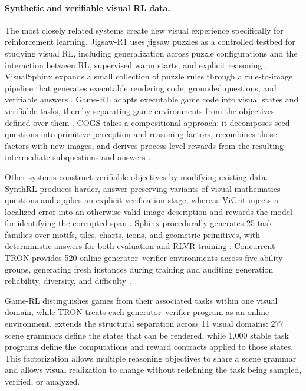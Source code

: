 \paragraph{Synthetic and verifiable visual RL data.}
The most closely related systems create new visual experience specifically for
reinforcement learning. Jigsaw-R1 uses jigsaw puzzles as a controlled testbed for
studying visual RL, including generalization across puzzle configurations and the
interaction between RL, supervised warm starts, and explicit reasoning
\citep{wang2025jigsawr1}. VisualSphinx expands a small collection of puzzle
rules through a rule-to-image pipeline that generates executable rendering code,
grounded questions, and verifiable answers \citep{feng2025visualsphinx}. Game-RL
adapts executable game code into visual states and verifiable tasks, thereby
separating game environments from the objectives defined over them
\citep{tong2025gamerl}. COGS takes a compositional approach: it decomposes seed
questions into primitive perception and reasoning factors, recombines those factors
with new images, and derives process-level rewards from the resulting intermediate
subquestions and answers \citep{gu2025cogs}.

Other systems construct verifiable objectives by modifying existing data.
SynthRL produces harder, answer-preserving variants of visual-mathematics
questions and applies an explicit verification stage, whereas ViCrit injects a
localized error into an otherwise valid image description and rewards the model
for identifying the corrupted span
\citep{wu2025synthrl,wang2025vicrit}. Sphinx procedurally generates 25 task
families over motifs, tiles, charts, icons, and geometric primitives, with
deterministic answers for both evaluation and RLVR training
\citep{alam2026sphinx}. Concurrent TRON provides 520 online
generator--verifier environments across five ability groups, generating fresh
instances during training and auditing generation reliability, diversity, and
difficulty \citep{yang2026tron}.

Game-RL distinguishes games from their associated tasks within one visual domain,
while TRON treats each generator--verifier program as an online environment.
\trace extends the structural separation across 11 visual domains: 277 scene
grammars define the states that can be rendered, while 1,000 stable task programs
define the computations and reward contracts applied to those states. This
factorization allows multiple reasoning objectives to share a scene grammar and
allows visual realization to change without redefining the task being sampled,
verified, or analyzed.
